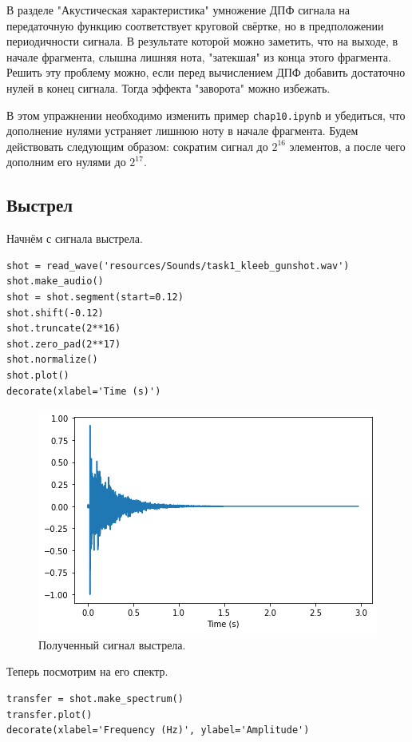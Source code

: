 \documentclass[a4paper, 14pt]{extarticle}
\begin{document}
    В разделе "Акустическая характеристика" умножение ДПФ сигнала на передаточную функцию соответствует
    круговой свёртке, но в предположении периодичности сигнала. В результате которой можно заметить,
    что на выходе, в начале фрагмента, слышна лишняя нота, "затекшая" из конца этого фрагмента.
    Решить эту проблему можно, если перед вычислением ДПФ добавить достаточно нулей в конец сигнала.
    Тогда эффекта "заворота" можно избежать.

    В этом упражнении необходимо изменить пример \texttt{chap10.ipynb} и убедиться, что дополнение нулями устраняет
    лишнюю ноту в начале фрагмента.
    Будем действовать следующим образом: сократим сигнал до $2^{16}$ элементов, а после чего дополним его нулями до $2^{17}$.

    \subsection{Выстрел}
    \label{subsec:task1_1}
    Начнём с сигнала выстрела.

    \begin{lstlisting}[caption= Чтение файла и дополнение сигнала выстрела нулями., label={lst:task1_shot_wave}]
shot = read_wave('resources/Sounds/task1_kleeb_gunshot.wav')
shot.make_audio()
shot = shot.segment(start=0.12)
shot.shift(-0.12)
shot.truncate(2**16)
shot.zero_pad(2**17)
shot.normalize()
shot.plot()
decorate(xlabel='Time (s)')     \end{lstlisting}

    \begin{figure}[H]
        \centering
        \includegraphics[width=0.6\linewidth]{resources/Images/task1_shot_wave}
        \caption{Полученный сигнал выстрела.}
        \label{fig:task1_shot_wave}
    \end{figure}

    Теперь посмотрим на его спектр.

    \begin{lstlisting}[caption= Получение спектра сигнала., label={lst:task1_shot_spectrum}]
transfer = shot.make_spectrum()
transfer.plot()
decorate(xlabel='Frequency (Hz)', ylabel='Amplitude')   \end{lstlisting}
\end{document}
